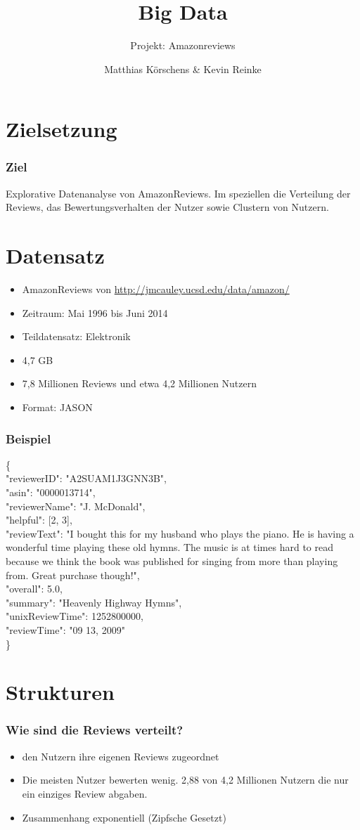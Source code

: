 \documentclass{beamer}
\title{Big Data}
\subtitle{Projekt: Amazonreviews}
\author[Nameshort]{Matthias Körschens \& Kevin Reinke}
\institute{Friedrich-Schiller-Universität Jena}
\begin{document}
	\nofooter{
		\frame{\titlepage}
	}
	\begin{frame}
		\tableofcontents
	\end{frame}
	\section{Zielsetzung}
	\begin{frame}
	\frametitle{Ziel}
	Explorative Datenanalyse von AmazonReviews. Im speziellen die Verteilung der Reviews, das Bewertungsverhalten der Nutzer sowie Clustern von Nutzern.
	\end{frame}
	\section{Datensatz}
	\begin{frame}
	\begin{itemize}
	\item AmazonReviews von \url{http://jmcauley.ucsd.edu/data/amazon/}
	\item Zeitraum: Mai 1996 bis Juni 2014
	\item Teildatensatz: Elektronik
	\item 4,7 GB
	\item 7,8 Millionen Reviews und etwa 4,2 Millionen Nutzern
	\item Format: JASON
	\end{itemize}
	\end{frame}
	\begin{frame}
	\frametitle{Beispiel}
	\{\\
  "reviewerID": "A2SUAM1J3GNN3B",\\ 
  "asin": "0000013714", \\
  "reviewerName": "J. McDonald", \\
  "helpful": [2, 3], \\
  "reviewText": "I bought this for my husband who plays the piano. He is having a wonderful time playing these old hymns. The music is at times hard to read because we think the book was published for singing from more than playing from. Great purchase though!", \\
  "overall": 5.0, \\
  "summary": "Heavenly Highway Hymns", \\
  "unixReviewTime": 1252800000, \\
  "reviewTime": "09 13, 2009" \\
  \}
	\end{frame}
	\section{Strukturen}
	\begin{frame}
	\frametitle{Wie sind die Reviews verteilt?}
	\begin{itemize}
	\item den Nutzern ihre eigenen Reviews zugeordnet
	\item Die meisten Nutzer bewerten wenig. 2,88 von 4,2 Millionen Nutzern die nur ein einziges Review abgaben.
	\item Zusammenhang exponentiell (Zipfsche Gesetzt)
	\end{itemize}
	\end{frame}
	
\end{document}
